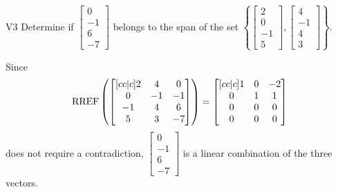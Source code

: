 \begin{problem}{V3}
  Determine if
  \(\begin{bmatrix} 0 \\ -1 \\ 6 \\ -7 \end{bmatrix}\)
  belongs to the span of the set
  \(\left\{
    \begin{bmatrix} 2 \\ 0 \\ -1 \\ 5 \end{bmatrix},
    \begin{bmatrix} 4 \\ -1 \\ 4 \\ 3 \end{bmatrix}
    \right\}
  \).
\end{problem}
\begin{solution}
  Since
  \[
    \operatorname{RREF}\left(
      \begin{bmatrix}[cc|c]
        2 & 4 & 0 \\
        0 & -1 & -1 \\
        -1 & 4 & 6 \\
        5 & 3 & -7
      \end{bmatrix}
    \right) =
    \begin{bmatrix}[cc|c]
      1 & 0 & -2 \\
      0 & 1 & 1 \\
      0 & 0 & 0 \\
      0 & 0 & 0
    \end{bmatrix}
  \]
  does not require a contradiction,
  \(\begin{bmatrix} 0 \\ -1 \\ 6 \\ -7 \end{bmatrix}\) is
  a linear combination of the three vectors.
\end{solution}


